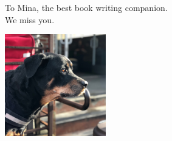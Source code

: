 
\cleardoublepage\newpage\thispagestyle{empty}\null
\cleardoublepage\newpage
\thispagestyle{empty}

\begin{center}
To Mina, the best book writing companion. \\
We miss you.

\includegraphics[width=0.33\textwidth]{mina.jpg}

\end{center}

\setlength{\abovedisplayskip}{-5pt}
\setlength{\abovedisplayshortskip}{-5pt}

\cleardoublepage
